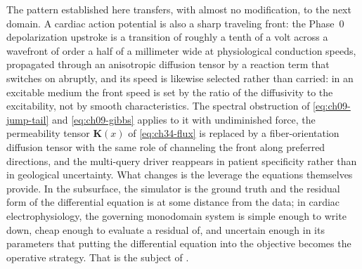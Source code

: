 The pattern established here transfers, with almost no modification, to the next
domain. A cardiac action potential is also a sharp traveling front: the Phase~0
depolarization upstroke is a transition of roughly a tenth of a volt across a
wavefront of order a half of a millimeter wide at physiological conduction
speeds, propagated through an anisotropic diffusion
tensor by a
reaction term that switches on abruptly, and its speed is likewise selected rather
than carried: in an excitable medium the front speed is set by the ratio of the
diffusivity to the excitability, not by smooth characteristics. The spectral obstruction of
\eqref{eq:ch09-jump-tail} and \eqref{eq:ch09-gibbs} applies to it with undiminished
force, the permeability tensor $\mathbf{K}(x)$ of \eqref{eq:ch34-flux} is replaced
by a fiber-orientation diffusion tensor with the same role of channeling the front
along preferred directions, and the multi-query driver reappears in patient
specificity rather than in geological uncertainty. What changes is the leverage the
equations themselves provide. In the subsurface, the simulator is the ground truth
and the residual form of the differential equation is at some distance from the
data; in cardiac
electrophysiology, the governing monodomain system is simple enough to write down,
cheap enough to evaluate a residual of, and uncertain enough in its parameters that
putting the differential equation into the objective becomes the operative
strategy. That is the subject of .

